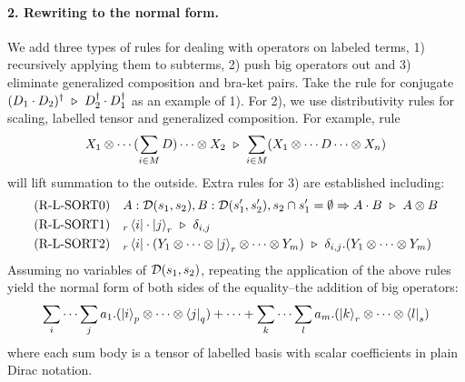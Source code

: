 \paragraph*{2. Rewriting to the normal form.}
We add three types of rules for dealing with operators on labeled terms, 1) recursively applying them to subterms, 2) push big operators out and 3) eliminate generalized composition and bra-ket pairs.
Take the rule for conjugate $(D_1 \cdot D_2)^\dagger \ \triangleright\ D_2^\dagger \cdot D_1^\dagger$ as an example of 1).
For 2), we use distributivity rules for scaling, labelled tensor and generalized composition. For example, rule
\[
X_1 \otimes \cdots (\sum_{i \in M} D) \cdots \otimes X_2\ \triangleright\ \sum_{i \in M} (X_1 \otimes \cdots D \cdots \otimes X_n)
\]
will lift summation to the outside.
Extra rules for 3) are established including:
\begin{align*}
    & \textrm{(R-L-SORT0)}
    && A : \mathcal{D}(s_1, s_2), B : \mathcal{D}(s_1', s_2'), s_2 \cap s_1'=\emptyset \Rightarrow A \cdot B \ \triangleright\ A \otimes B \\
    & \textrm{(R-L-SORT1)}
    && {}_r\bra{i}\cdot\ket{j}_r \ \triangleright\ \delta_{i, j} \\
    & \textrm{(R-L-SORT2)}
    && {}_r\bra{i}\cdot(Y_1 \otimes \cdots \otimes \ket{j}_r \otimes \cdots \otimes Y_m) \ \triangleright\ \delta_{i, j}.(Y_1  \otimes \cdots \otimes Y_m)
\end{align*}
Assuming no variables of $\mathcal{D}(s_1, s_2)$, 
repeating the application of the above rules yield the normal form of both sides of the equality--the addition of big operators: 
\begin{equation}
  \label{eqn:Labelled normal}
  \sum_{i}\cdots\sum_{j} a_1 . (\ket{i}_{p} \otimes \cdots \otimes \bra{j}_{q})
  + \cdots +
  \sum_{k}\cdots\sum_{l} a_m . (\ket{k}_{r} \otimes \cdots \otimes \bra{l}_{s})
\end{equation}
where each sum body is a tensor of labelled basis with scalar coefficients in plain Dirac notation.
